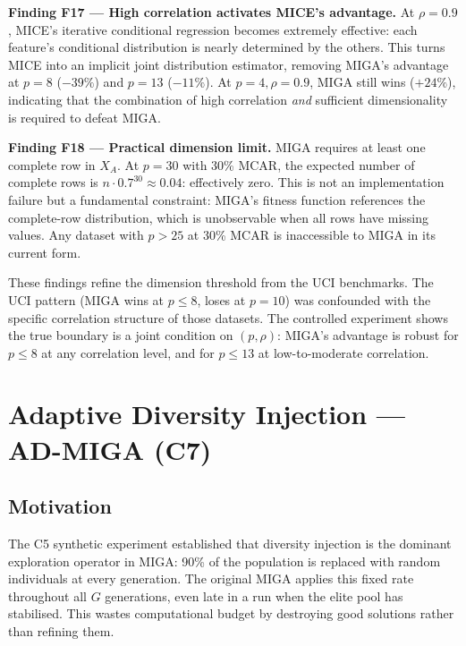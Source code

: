 \textbf{Finding F17 --- High correlation activates MICE's advantage.} At $\rho = 0.9$, MICE's iterative conditional regression becomes extremely effective: each feature's conditional distribution is nearly determined by the others. This turns MICE into an implicit joint distribution estimator, removing MIGA's advantage at $p=8$ ($-39\%$) and $p=13$ ($-11\%$). At $p=4, \rho=0.9$, MIGA still wins ($+24\%$), indicating that the combination of high correlation \emph{and} sufficient dimensionality is required to defeat MIGA.

\textbf{Finding F18 --- Practical dimension limit.} MIGA requires at least one complete row in $X_A$. At $p=30$ with 30\% MCAR, the expected number of complete rows is $n \cdot 0.7^{30} \approx 0.04$: effectively zero. This is not an implementation failure but a fundamental constraint: MIGA's fitness function references the complete-row distribution, which is unobservable when all rows have missing values. Any dataset with $p > 25$ at 30\% MCAR is inaccessible to MIGA in its current form.

These findings refine the dimension threshold from the UCI benchmarks. The UCI pattern (MIGA wins at $p \leq 8$, loses at $p = 10$) was confounded with the specific correlation structure of those datasets. The controlled experiment shows the true boundary is a joint condition on $(p, \rho)$: MIGA's advantage is robust for $p \leq 8$ at any correlation level, and for $p \leq 13$ at low-to-moderate correlation.


\section{Adaptive Diversity Injection --- AD-MIGA (C7)}
\label{sec:ad_miga_full}

\subsection{Motivation}

The C5 synthetic experiment established that diversity injection is the dominant exploration operator in MIGA: 90\% of the population is replaced with random individuals at every generation. The original MIGA applies this fixed rate throughout all $G$ generations, even late in a run when the elite pool has stabilised. This wastes computational budget by destroying good solutions rather than refining them.

